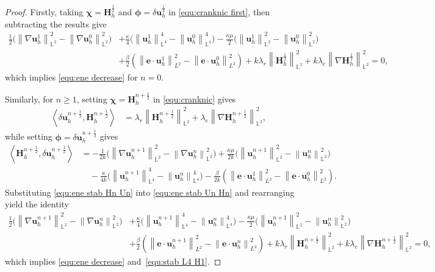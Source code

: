 \documentclass[11pt, reqno]{amsart}
\theoremstyle{definition}
\theoremstyle{remark}
\numberwithin{equation}{section}
\newcommand{\bff}{\boldsymbol}
\newcommand{\bb}{\mathbb}
\newcommand{\norm}[2]{\left\|{#1}\right\|_{#2}}
\newcommand{\inpro}[2]{\left\langle#1,#2\right\rangle}
\begin{document}
\begin{proof}
Firstly, taking $\bff{\chi}=\bff{H}_h^{\frac{1}{2}}$ and $\bff{\phi}=\delta \bff{u}_h^{\frac{1}{2}}$ in \eqref{equ:cranknic first}, then subtracting the results give 
\begin{align*}
	\frac{1}{2} \big(\norm{\nabla \bff{u}_h^{1}}{\bb{L}^2}^2 - \norm{\nabla \bff{u}_h^0}{\bb{L}^2}^2 \big)
	&+
	\frac{\kappa}{4} \big( \norm{\bff{u}_h^{1}}{\bb{L}^4}^4 - \norm{\bff{u}_h^0}{\bb{L}^4}^4 \big)
	-
	\frac{\kappa\mu}{2} \big(\norm{\bff{u}_h^{1}}{\bb{L}^2}^2 - \norm{\bff{u}_h^0}{\bb{L}^2}^2\big)
	\\
	&
	+
	\frac{\beta}{2} \left(\norm{\bff{e}\cdot\bff{u}_h^1}{L^2}^2 - \norm{\bff{e}\cdot \bff{u}_h^0}{L^2}^2\right)
	+
	k\lambda_r \norm{\bff{H}_h^{\frac{1}{2}}}{\bb{L}^2}^2
	+
	k\lambda_e \norm{\nabla \bff{H}_h^{\frac{1}{2}}}{\bb{L}^2}^2
	= 0,
\end{align*}
which implies \eqref{equ:ene decrease} for $n=0$.

Similarly, for $n\geq 1$, setting $\bff{\chi}=\bff{H}_h^{n+\frac{1}{2}}$ in \eqref{equ:cranknic} gives
\begin{align}\label{equ:ene stab Un Hn}
	\inpro{\delta \bff{u}_h^{n+\frac{1}{2}}}{\bff{H}_h^{n+\frac{1}{2}}}
	&=
	\lambda_r \norm{\bff{H}_h^{n+\frac{1}{2}}}{\bb{L}^2}^2
	+
	\lambda_e \norm{\nabla \bff{H}_h^{n+\frac{1}{2}}}{\bb{L}^2}^2,
\end{align}
while setting $\bff{\phi}=\delta \bff{u}_h^{n+\frac{1}{2}}$ gives
\begin{align}\label{equ:ene stab Hn Un}
	\nonumber
	\inpro{\bff{H}_h^{n+\frac{1}{2}}}{\delta \bff{u}_h^{n+\frac{1}{2}}}
	&=
	-\frac{1}{2k} \big(\norm{\nabla \bff{u}_h^{n+1}}{\bb{L}^2}^2 - \norm{\nabla \bff{u}_h^n}{\bb{L}^2}^2 \big)
	+
	\frac{\kappa\mu}{2k} \big(\norm{\bff{u}_h^{n+1}}{\bb{L}^2}^2 - \norm{\bff{u}_h^n}{\bb{L}^2}^2\big)
	\\
	&\quad
	-
	\frac{\kappa}{4k} \big( \norm{\bff{u}_h^{n+1}}{\bb{L}^4}^4 - \norm{\bff{u}_h^n}{\bb{L}^4}^4 \big)
	-
	\frac{\beta}{2k} \left(\norm{\bff{e}\cdot\bff{u}_h^1}{L^2}^2 - \norm{\bff{e}\cdot \bff{u}_h^0}{L^2}^2\right).
\end{align}
Substituting \eqref{equ:ene stab Hn Un} into \eqref{equ:ene stab Un Hn} and rearranging yield the identity
\begin{align*}
	\frac{1}{2} \big(\norm{\nabla \bff{u}_h^{n+1}}{\bb{L}^2}^2 - \norm{\nabla \bff{u}_h^n}{\bb{L}^2}^2 \big)
	&+
	\frac{\kappa}{4} \big( \norm{\bff{u}_h^{n+1}}{\bb{L}^4}^4 - \norm{\bff{u}_h^n}{\bb{L}^4}^4 \big)
	-
	\frac{\kappa\mu}{2} \big(\norm{\bff{u}_h^{n+1}}{\bb{L}^2}^2 - \norm{\bff{u}_h^n}{\bb{L}^2}^2\big)
	\\
	&
	+
	\frac{\beta}{2} \left(\norm{\bff{e}\cdot\bff{u}_h^{n+1}}{L^2}^2 - \norm{\bff{e}\cdot \bff{u}_h^n}{L^2}^2\right)
	+
	k\lambda_r \norm{\bff{H}_h^{n+\frac{1}{2}}}{\bb{L}^2}^2
	+
	k\lambda_e \norm{\nabla \bff{H}_h^{n+\frac{1}{2}}}{\bb{L}^2}^2
	= 0,
\end{align*}
which implies \eqref{equ:ene decrease} and~\eqref{equ:stab L4 H1}.
\end{proof}
\end{document}
